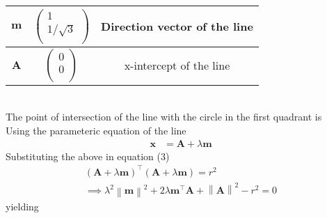 \documentclass[10pt,a4paper]{report}
\providecommand{\norm}[1]{\left\lVert#1\right\rVert}
\let\vec\mathbf
\begin{document}
\begin{multicols}{2}
\begin{tabular}{|c|c|c|}
         \hline
	 $\vec m$ & $\begin{pmatrix}1 \\ 1/\sqrt{3} \\ \end{pmatrix}$ & Direction vector of the line\\
         \hline                                                                                          
	$\vec A$ & $\begin{pmatrix}0 \\ 0 \\ \end{pmatrix}$ & x-intercept of the line\\
	\hline                                                                                          
\end{tabular}\\
The point of intersection of the line with the circle in the first quadrant is \\
Using the parameteric equation of the line                                                  
	  \begin{align}                                                                                 
	  \vec{x} &= \vec{A} + \lambda \vec{m}                                                
	  \end{align}                                                                                 
	  Substituting the above in equation (3)                               
	  \begin{align}                                                                            
		  ({ \vec{A} + \lambda \vec{m}})^{\top}                                            
		  ({ \vec{A} + \lambda \vec{m}})
               = r^2  \\
                              \implies \lambda^2\norm{\vec{m}}^2+ 2 \lambda \vec{m}^{\top}\vec{A}   +\norm{\vec{A}}^2 - r^2 = 0
	  \end{align}
yielding                                                                                    
	                                                                                       

\end{multicols}
\end{document}
